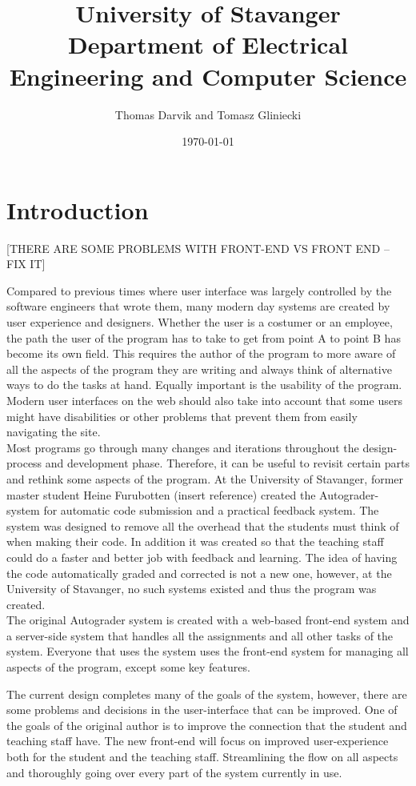 \documentclass[11pt,a4paper]{report}
\title{University of Stavanger\\
Department of Electrical Engineering and Computer Science}
\author{Thomas Darvik and Tomasz Gliniecki}
\date{\today}
\begin{document}
\maketitle
\chapter{Introduction}

[THERE ARE SOME PROBLEMS WITH FRONT-END VS FRONT END -- FIX IT]

Compared to previous times where user interface was largely controlled by the software engineers that wrote them, many modern day systems are created by user experience and designers. Whether the user is a costumer or an employee, the path the user of the program has to take to get from point A to point B has become its own field. This requires the author of the program to more aware of all the aspects of the program they are writing and always think of alternative ways to do the tasks at hand. Equally important is the usability of the program. Modern user interfaces on the web should also take into account that some users might have disabilities or other problems that prevent them from easily navigating the site. 
\\
Most programs go through many changes and iterations throughout the design-process and development phase. Therefore, it can be useful to revisit certain parts and rethink some aspects of the program. At the University of Stavanger, former master student Heine Furubotten (insert reference) created the Autograder-system for automatic code submission and a practical feedback system. The system was designed to remove all the overhead that the students must think of when making their code. In addition it was created so that the teaching staff could do a faster and better job with feedback and learning. The idea of having the code automatically graded and corrected is not a new one, however, at the University of Stavanger, no such systems existed and thus the program was created.
\\
The original Autograder system is created with a web-based front-end system and a server-side system that handles all the assignments and all other tasks of the system. Everyone that uses the system uses the front-end system for managing all aspects of the program, except some key features.


The current design completes many of the goals of the system, however, there are some problems and decisions in the user-interface that can be improved. One of the goals of the original author is to improve the connection that the student and teaching staff have. The new front-end will focus on improved user-experience both for the student and the teaching staff. Streamlining the flow on all aspects and thoroughly going over every part of the system currently in use.
\\
\end{document}
